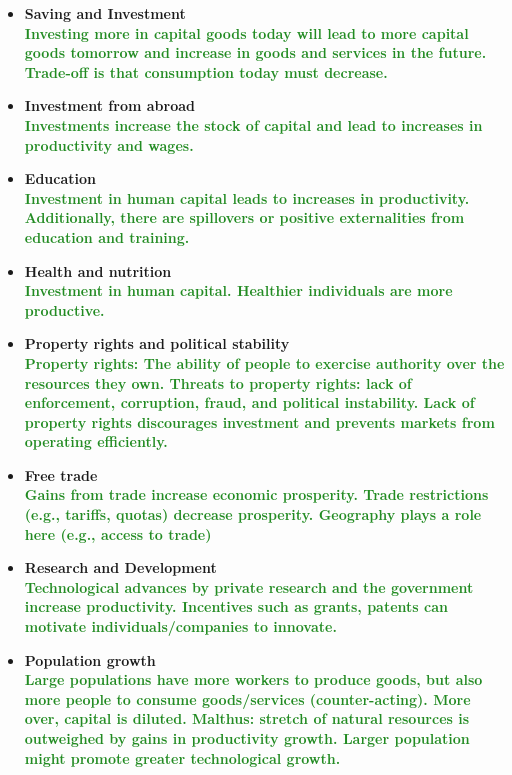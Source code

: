 \documentclass[11pt]{article}\usepackage[]{graphicx}\usepackage[]{color}
\theoremstyle{definition}
\newcommand{\blank}[1]{}
\newcommand{\ddp}[1]{{\textbf{\textcolor{ForestGreen}{#1}}}}
\begin{document}
\begin{itemize}
	\item \textbf{Saving and Investment}
	 \ddp{\\Investing more in capital goods today will lead to more capital goods tomorrow and increase in goods and services in the future. Trade-off is that consumption today must decrease.}
	\blank{}
	\blank{}
	\item \textbf{Investment from abroad} 
	\ddp{\\Investments increase the stock of capital and lead to increases in productivity and wages.}
	\blank{}
	\blank{}
	\item \textbf{Education} 
	\ddp{\\Investment in human capital leads to increases in productivity. Additionally, there are spillovers or positive externalities from education and training.}
	\blank{}
	\blank{}
	\item \textbf{Health and nutrition} 
	\ddp{\\Investment in human capital. Healthier individuals are more productive.}
	\blank{}
	\blank{}
	\item \textbf{Property rights and political stability}
	 \ddp{\\Property rights: The ability of people to exercise authority over the resources they own. Threats to property rights: lack of enforcement, corruption, fraud, and political instability. Lack of property rights discourages investment and prevents markets from operating efficiently.}
	\blank{}
	\blank{}
	\item \textbf{Free trade} 
	\ddp{\\Gains from trade increase economic prosperity. Trade restrictions (e.g., tariffs, quotas) decrease prosperity. Geography plays a role here (e.g., access to trade)}
	\blank{}
	\blank{}
	\item \textbf{Research and Development} 
	\ddp{\\Technological advances by private research and the government increase productivity. Incentives such as grants, patents can motivate individuals/companies to innovate.}
	\blank{}
	\blank{}
	\item \textbf{Population growth} 
	\ddp{\\Large populations have more workers to produce goods, but also more people to consume goods/services (counter-acting). More over, capital is diluted. Malthus: stretch of natural resources is outweighed by gains in productivity growth. Larger population might promote greater technological growth.}
	\blank{}
	\blank{}
\end{itemize}
\end{document}

